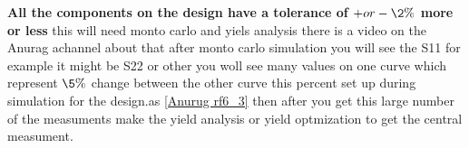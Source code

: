 \documentclass{article}
\begin{document}
\begin{itemize}
\textbf{All the components on the design have a tolerance of  $+ or - \2\%$  more or less }
this will need monto carlo and yiels analysis  there is a video on the Anurag achannel about that after monto carlo simulation you will  see the S11 for example it might be S22 or other  you woll see many values on one  curve  which represent  $ \5\%$ change between the other curve this percent set up during simulation for the design.as \cref{Anurug rf6_3}
then after you get this large number of the measuments make the yield analysis or yield optmization to get the central measument.







































































     










    

\end{itemize}
\end{document}
